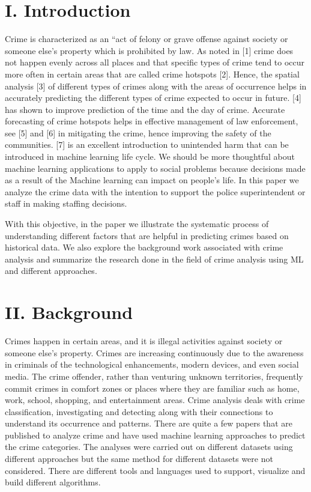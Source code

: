 \documentclass[conference,final, 10pt]{IEEEtran}
\begin{document}
\section{I. Introduction}\label{i.-introduction}

Crime is characterized as an ``act of felony or grave offense against
society or someone else's property which is prohibited by law. As noted
in {[}1{]} crime does not happen evenly across all places and that
specific types of crime tend to occur more often in certain areas that
are called crime hotspots {[}2{]}. Hence, the spatial analysis {[}3{]}
of different types of crimes along with the areas of occurrence helps in
accurately predicting the different types of crime expected to occur in
future. {[}4{]} has shown to improve prediction of the time and the day
of crime. Accurate forecasting of crime hotspots helps in effective
management of law enforcement, see {[}5{]} and {[}6{]} in mitigating the
crime, hence improving the safety of the communities. {[}7{]} is an
excellent introduction to unintended harm that can be introduced in
machine learning life cycle. We should be more thoughtful about machine
learning applications to apply to social problems because decisions made
as a result of the Machine learning can impact on people's life. In this
paper we analyze the crime data with the intention to support the police
superintendent or staff in making staffing decisions.

With this objective, in the paper we illustrate the systematic process
of understanding different factors that are helpful in predicting crimes
based on historical data. We also explore the background work associated
with crime analysis and summarize the research done in the field of
crime analysis using ML and different approaches.

\section{II. Background}\label{ii.-background}

Crimes happen in certain areas, and it is illegal activities against
society or someone else's property. Crimes are increasing continuously
due to the awareness in criminals of the technological enhancements,
modern devices, and even social media. The crime offender, rather than
venturing unknown territories, frequently commit crimes in comfort zones
or places where they are familiar such as home, work, school, shopping,
and entertainment areas. Crime analysis deals with crime classification,
investigating and detecting along with their connections to understand
its occurrence and patterns. There are quite a few papers that are
published to analyze crime and have used machine learning approaches to
predict the crime categories. The analyses were carried out on different
datasets using different approaches but the same method for different
datasets were not considered. There are different tools and languages
used to support, visualize and build different algorithms.
\end{document}
